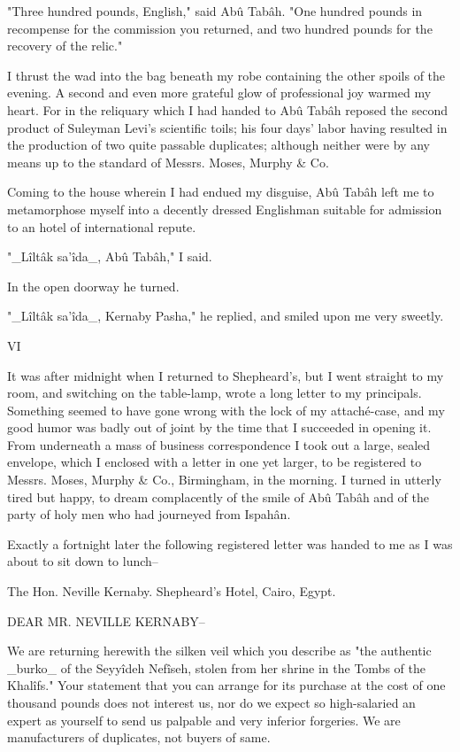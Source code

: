 "Three hundred pounds, English," said Abû Tabâh. "One hundred pounds
in recompense for the commission you returned, and two hundred pounds
for the recovery of the relic."

I thrust the wad into the bag beneath my robe containing the other
spoils of the evening. A second and even more grateful glow of
professional joy warmed my heart. For in the reliquary which I had
handed to Abû Tabâh reposed the second product of Suleyman Levi's
scientific toils; his four days' labor having resulted in the
production of two quite passable duplicates; although neither were by
any means up to the standard of Messrs. Moses, Murphy & Co.

Coming to the house wherein I had endued my disguise, Abû Tabâh left
me to metamorphose myself into a decently dressed Englishman suitable
for admission to an hotel of international repute.

"_Lîltâk sa'îda_, Abû Tabâh," I said.

In the open doorway he turned.

"_Lîltâk sa'îda_, Kernaby Pasha," he replied, and smiled upon me very
sweetly.


VI

It was after midnight when I returned to Shepheard's, but I went
straight to my room, and switching on the table-lamp, wrote a long
letter to my principals. Something seemed to have gone wrong with the
lock of my attaché-case, and my good humor was badly out of joint by
the time that I succeeded in opening it. From underneath a mass of
business correspondence I took out a large, sealed envelope, which I
enclosed with a letter in one yet larger, to be registered to Messrs.
Moses, Murphy & Co., Birmingham, in the morning. I turned in utterly
tired but happy, to dream complacently of the smile of Abû Tabâh and
of the party of holy men who had journeyed from Ispahân.

Exactly a fortnight later the following registered letter was handed
to me as I was about to sit down to lunch--

  The Hon. Neville Kernaby.
    Shepheard's Hotel,
      Cairo, Egypt.

  DEAR MR. NEVILLE KERNABY--

  We are returning herewith the silken veil which you describe as "the
  authentic _burko_ of the Seyyîdeh Nefîseh, stolen from her shrine in
  the Tombs of the Khalîfs." Your statement that you can arrange for its
  purchase at the cost of one thousand pounds does not interest us, nor
  do we expect so high-salaried an expert as yourself to send us
  palpable and very inferior forgeries. We are manufacturers of
  duplicates, not buyers of same.

